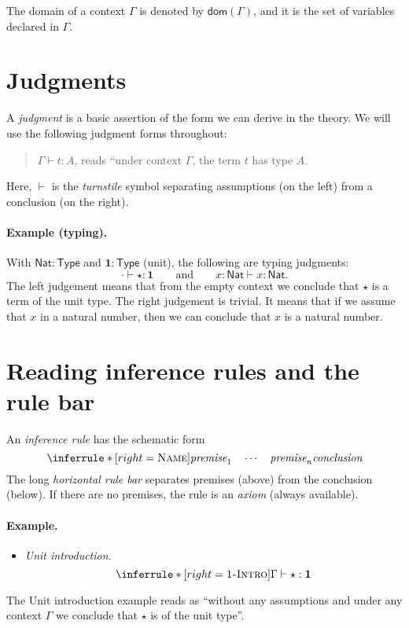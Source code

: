 \documentclass{article}
\newcommand{\Type}{\mathsf{Type}}
\newcommand{\Nat}{\mathsf{Nat}}
\newcommand{\emptyctx}{\cdot}              %
\newcommand{\judg}[3]{#1 \vdash #2 : #3}   %
\newcommand{\dom}{\mathsf{dom}}            %
\newcommand{\rulename}[1]{\textsc{#1}}
\begin{document}
The domain of a context $\Gamma$ is denoted by \(\dom(\Gamma)\), and it is the set of variables declared in \(\Gamma\).

\section{Judgments}

A \emph{judgment} is a basic assertion of the form we can derive in the theory.  
We will use the following judgment forms throughout:
\begin{quote}
  \(\judg{\Gamma}{t}{A}\), reads “under context \(\Gamma\), the term \(t\) has type \(A\).
\end{quote}
Here, \(\vdash\) is the \emph{turnstile} symbol separating assumptions (on the left) from a conclusion (on the right).

\paragraph{Example (typing).}
With \(\Nat : \Type\) and \(\mathbf{1}:\Type\) (unit), the following are typing judgments:
\[
\emptyctx \vdash \star : \mathbf{1}
\qquad\text{and}\qquad
x:\Nat \vdash x : \Nat.
\]
The left judgement means that from the empty context we conclude that $\star$ is a term of the unit type. The right judgement is trivial. It means that if we assume that $x$ in a natural number, then we can conclude that $x$ is a natural number.

\section{Reading inference rules and the rule bar}

An \emph{inference rule} has the schematic form
\[
\inferrule*[right=\rulename{Name}]{
\textit{premise}_1 \quad \cdots \quad \textit{premise}_n
}{
\textit{conclusion}
}
\]
The long \emph{horizontal rule bar} separates premises (above) from the conclusion (below).  
If there are no premises, the rule is an \emph{axiom} (always available).

\paragraph{Example.}
\begin{itemize}
  \item \emph{Unit introduction.}
  \[
  \inferrule*[right=\rulename{1-Intro}]{
  }{
  \judg{\Gamma}{\star}{\mathbf{1}}
  }
  \]
\end{itemize}
The Unit introduction example reads as ``without any assumptions and under any context $\Gamma$ we conclude that $\star$ is of the unit type''.
\end{document}
